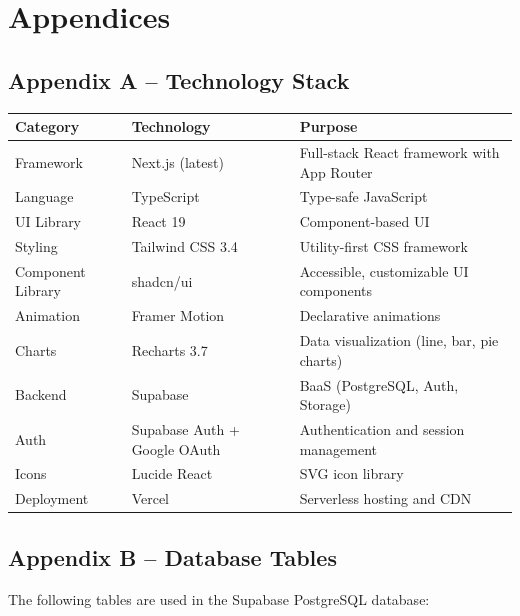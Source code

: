 \documentclass[11pt,a4paper]{article}
\begin{document}
\section{Appendices}
\label{sec:appendices}

\subsection*{Appendix A -- Technology Stack}

\begin{table}[h!]
\centering
\small
\renewcommand{\arraystretch}{1.4}
\begin{tabular}{|p{3.5cm}|p{4cm}|p{5.5cm}|}
\hline
\textbf{Category} & \textbf{Technology} & \textbf{Purpose} \\ \hline
Framework & Next.js (latest) & Full-stack React framework with App Router \\ \hline
Language & TypeScript & Type-safe JavaScript \\ \hline
UI Library & React 19 & Component-based UI \\ \hline
Styling & Tailwind CSS 3.4 & Utility-first CSS framework \\ \hline
Component Library & shadcn/ui & Accessible, customizable UI components \\ \hline
Animation & Framer Motion & Declarative animations \\ \hline
Charts & Recharts 3.7 & Data visualization (line, bar, pie charts) \\ \hline
Backend & Supabase & BaaS (PostgreSQL, Auth, Storage) \\ \hline
Auth & Supabase Auth + Google OAuth & Authentication and session management \\ \hline
Icons & Lucide React & SVG icon library \\ \hline
Deployment & Vercel & Serverless hosting and CDN \\ \hline
\end{tabular}
\end{table}


\subsection*{Appendix B -- Database Tables}

The following tables are used in the Supabase PostgreSQL database:
\end{document}
